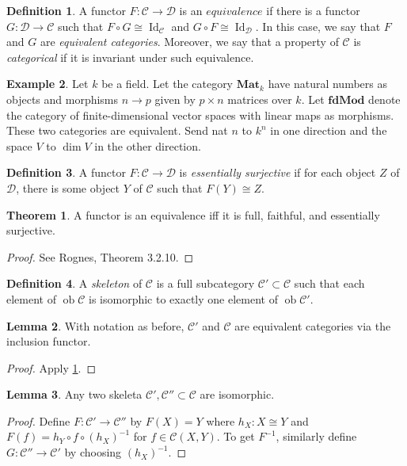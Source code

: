 \documentclass[10pt,letterpaper,cm]{nupset}
\theoremstyle{definition}
\newtheorem{definition}{Definition}
\newtheorem{exmp}[definition]{Example}
\theoremstyle{theorem}
\newtheorem{theorem}{Theorem}
\newtheorem{lemma}[theorem]{Lemma}
\theoremstyle{remark}
\newcommand{\1}{\mathbf{1}}
\renewcommand{\c}{\mathscr{C}}
\renewcommand{\d}{\mathscr{D}}
\newcommand{\0}{\vec 0}
\DeclareMathOperator{\id}{Id}
\DeclareMathOperator{\ob}{ob}
\begin{document}
\begin{definition}
A functor $F: \c \to \d$ is an $\textit{equivalence}$ if there is a functor $G: \d \to \c$ such that $F \circ G \cong \id_{\c}$ and $G \circ F \cong \id_{\d}$. In this case, we say that $F$ and $G$ are \textit{equivalent categories}. Moreover, we say that a property of $\c$ is \textit{categorical} if it is invariant under such equivalence.
\end{definition}

\begin{exmp}
Let $k$ be a field. Let the category $\mathbf{Mat}_k$  have natural numbers as objects and morphisms $n \to p$ given by $p \times n$ matrices over $k$. Let $\mathbf{fdMod}$ denote the category of finite-dimensional vector spaces with linear maps as morphisms. These two categories are equivalent. Send nat $n$ to $k^n$ in one direction and the space $V$ to $\dim V$ in the other direction.    
\end{exmp}

\begin{definition}
A functor $F : \c \to \d$ is \textit{essentially surjective} if for each object $Z$ of  $\d$, there is some object $Y$ of $\c$ such that $F(Y) \cong Z$.
\end{definition}

\begin{theorem}\label{equiv}
A functor is an equivalence iff it is full, faithful, and essentially surjective. 
\end{theorem}
\begin{proof}
See Rognes, Theorem 3.2.10.
\end{proof}

\begin{definition}
A \textit{skeleton} of $\c$ is a full subcategory $\c' \subset \c$ such that each element of $\ob \c$ is isomorphic to exactly one element of $\ob \c'$.
\end{definition}

\begin{lemma}
With notation as before, $\c'$ and $\c$ are equivalent categories via the inclusion functor.
\end{lemma}
\begin{proof}
Apply \cref{equiv}.
\end{proof}

\begin{lemma}
Any two skeleta $\c', \c'' \subset \c$ are isomorphic.
\end{lemma}
\begin{proof}
Define $F: \c' \to \c''$ by $F(X) =Y$ where $h_X: X \cong Y$ and $F(f) = h_Y \circ f \circ (h_X)^{-1}$ for $f\in \c(X, Y)$. 
To get $F^{-1}$, similarly define $G: \c'' \to \c'$ by choosing $(h_X)^{-1}$.
\end{proof}
\end{document}
